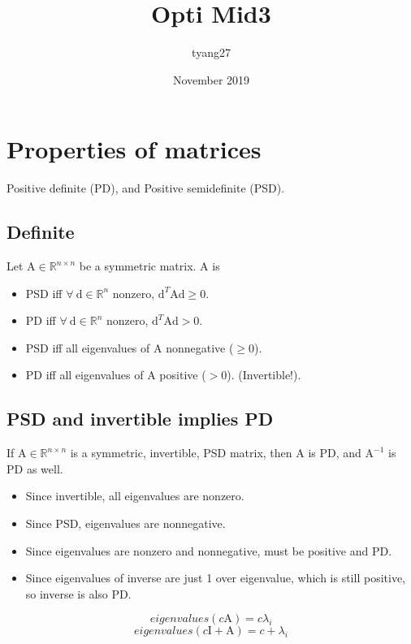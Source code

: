 \documentclass[6pt]{article}
\title{Opti Mid3}
\author{tyang27}
\date{November 2019}
\def\d{\textrm{d}}
\def\A{\textrm{A}}
\def\I{\textrm{I}}
\begin{document}
\maketitle
\section{Properties of matrices}
Positive definite (PD), and Positive semidefinite (PSD).
\subsection{Definite}
Let $\A \in \mathbb{R}^{n\times n}$ be a symmetric matrix. $\A$ is
\begin{itemize}
    \item PSD iff $\forall~\d \in \mathbb{R}^{n}$ nonzero, $\d^T\A\d\geq 0$.
    \item PD iff $\forall~\d \in \mathbb{R}^{n}$ nonzero, $\d^T\A\d>0$.
    \item PSD iff all eigenvalues of $\A$ nonnegative ($\geq 0$).
    \item PD iff all eigenvalues of $\A$ positive ($>0$). (Invertible!).
\end{itemize}
\subsection{PSD and invertible implies PD}
If $\A \in \mathbb{R}^{n\times n}$ is a symmetric, invertible, PSD matrix, then  $\A$ is PD, and $\A^{-1}$ is PD as well.
\begin{itemize}
    \item Since invertible, all eigenvalues are nonzero.
    \item Since PSD, eigenvalues are nonnegative.
    \item Since eigenvalues are nonzero and nonnegative, must be positive and PD.
    \item Since eigenvalues of inverse are just 1 over eigenvalue, which is still positive, so inverse is also PD.
\end{itemize}
$$eigenvalues(c\A) = c\lambda_i$$
$$eigenvalues(c\I + \A) = c + \lambda_i$$
\end{document}
